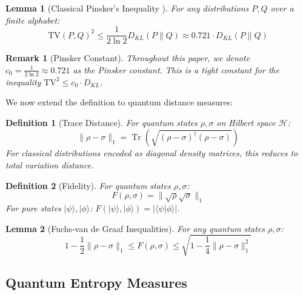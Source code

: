 \documentclass{ieeeaccess}
\newtheorem{lemma}{Lemma}[section]
\newtheorem{definition}{Definition}[section]
\newtheorem{remark}{Remark}[section]
\begin{document}
\begin{lemma}[Classical Pinsker's Inequality {\cite[Lemma II-B.1]{Minka2026CRO}}]
For any distributions $P, Q$ over a finite alphabet:
\begin{equation}
    \text{TV}(P, Q)^2 \leq \frac{1}{2\ln 2} D_{KL}(P\|Q) \approx 0.721 \cdot D_{KL}(P\|Q)
\end{equation}
\end{lemma}

\begin{remark}[Pinsker Constant]
Throughout this paper, we denote $c_0 = \frac{1}{2\ln 2} \approx 0.721$ as the Pinsker constant. This is a tight constant for the inequality $\text{TV}^2 \leq c_0 \cdot D_{KL}$.
\end{remark}

We now extend the definition to quantum distance measures:

\begin{definition}[Trace Distance]
For quantum states $\rho, \sigma$ on Hilbert space $\mathcal{H}$:
\begin{equation}
    \|\rho - \sigma\|_1 = \operatorname{Tr}\left(\sqrt{(\rho-\sigma)^\dagger(\rho-\sigma)}\right)
\end{equation}
For classical distributions encoded as diagonal density matrices, this reduces to total variation distance.
\end{definition}

\begin{definition}[Fidelity]
For quantum states $\rho, \sigma$:
\begin{equation}
    F(\rho, \sigma) = \|\sqrt{\rho}\sqrt{\sigma}\|_1
\end{equation}
For pure states $|\psi\rangle, |\phi\rangle$: $F(|\psi\rangle, |\phi\rangle) = |\langle\psi|\phi\rangle|$.
\end{definition}

\begin{lemma}[Fuchs-van de Graaf Inequalities]
For any quantum states $\rho, \sigma$:
\begin{equation}
    1 - \frac{1}{2}\|\rho - \sigma\|_1 \leq F(\rho, \sigma) \leq \sqrt{1 - \frac{1}{4}\|\rho - \sigma\|_1^2}
\end{equation}
\end{lemma}

\subsection{Quantum Entropy Measures}
\end{document}
